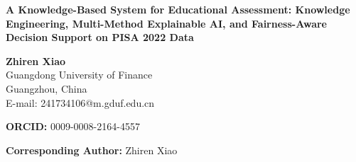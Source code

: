 \documentclass[12pt]{article}
\begin{document}
\begin{center}

\vspace{2cm}

{\LARGE \textbf{A Knowledge-Based System for Educational Assessment: Knowledge Engineering, Multi-Method Explainable AI, and Fairness-Aware Decision Support on PISA 2022 Data}}

\vspace{2cm}

{\large \textbf{Zhiren Xiao}} \\[0.5cm]

Guangdong University of Finance \\
Guangzhou, China \\[0.5cm]

E-mail: 241734106@m.gduf.edu.cn \\

\vspace{1cm}

\textbf{ORCID:} 0009-0008-2164-4557

\vspace{1cm}

\textbf{Corresponding Author:} Zhiren Xiao

\end{center}
\end{document}
